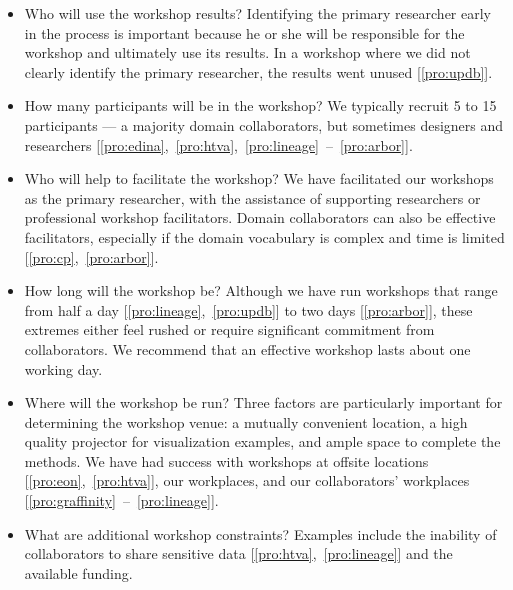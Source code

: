 \begin{itemize}[nolistsep,noitemsep]

\item Who will use the workshop results? Identifying the primary researcher early in the process is important because he or she will be responsible for the workshop and ultimately use its results. In a workshop where we did not clearly identify the primary researcher, the results went unused [\ref{pro:updb}].

\item How many participants will be in the workshop? We typically recruit 5 to 15 participants --- a majority domain collaborators, but sometimes designers and researchers [\ref{pro:edina},~\ref{pro:htva},~\ref{pro:lineage}~--~\ref{pro:arbor}].

\item Who will help to facilitate the workshop? We have facilitated our workshops as the primary researcher, with the assistance of supporting researchers or professional workshop facilitators. Domain collaborators can also be effective facilitators, especially if the domain vocabulary is complex and time is limited [\ref{pro:cp},~\ref{pro:arbor}].

\item How long will the workshop be? Although we have run workshops that range from half a day [\ref{pro:lineage},~\ref{pro:updb}] to two days [\ref{pro:arbor}], these extremes either feel rushed or require significant commitment from collaborators. We recommend that an effective workshop lasts about one working day.

\item Where will the workshop be run? Three factors are particularly important for determining the workshop venue: a mutually convenient location, a high quality projector for visualization examples, and ample space to complete the methods. We have had success with workshops at offsite locations [\ref{pro:eon},~\ref{pro:htva}], our workplaces, and our collaborators' workplaces [\ref{pro:graffinity}~--~\ref{pro:lineage}].

\item What are additional workshop constraints? Examples include the inability of collaborators to share sensitive data [\ref{pro:htva},~\ref{pro:lineage}] and the available funding.

\end{itemize} 

